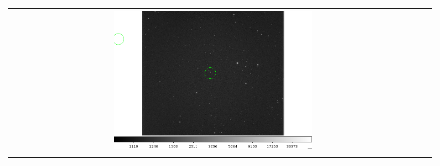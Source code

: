 \documentclass[letterpaper,12pt]{article}
\begin{document}
\begin{figure}[h!]
\begin{tabular}{cc}
                                                                                                                                                                                                                                                                                                                                                                                                                                                                                                                                                                                                                                                                                                                                                                                                                                     \includegraphics[width=0.5\textwidth]{asteroid_22.png} &

\end{tabular}
\end{figure}
\end{document}
